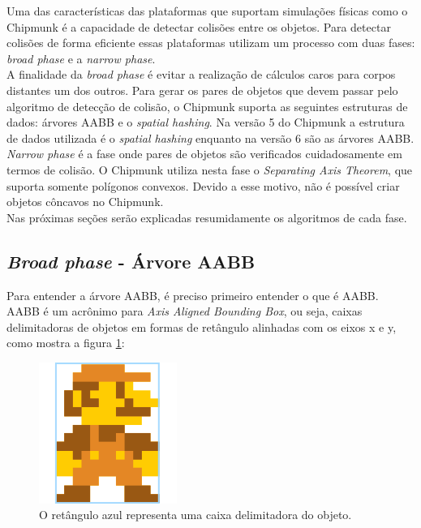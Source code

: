 Uma das características das plataformas que suportam simulações físicas como o Chipmunk é a capacidade de detectar colisões entre os objetos. 
Para detectar colisões de forma eficiente essas plataformas utilizam um processo com duas fases: \textit{broad phase} e a \textit{narrow phase}.\\

A finalidade da \textit{broad phase} é evitar a realização de cálculos caros para corpos distantes um dos outros. Para
gerar os pares de objetos que devem passar pelo algoritmo de detecção de colisão, o Chipmunk suporta as seguintes estruturas de dados:
árvores AABB e o \textit{spatial hashing}. Na versão 5 do Chipmunk a estrutura de dados utilizada é o \textit{spatial hashing} enquanto na versão 6 são as árvores AABB. \\

\textit{Narrow phase} é a fase onde pares de objetos são verificados cuidadosamente em termos de colisão. O Chipmunk utiliza nesta fase o \textit{Separating Axis Theorem}, que suporta somente polígonos convexos. Devido a esse motivo, não é possível criar objetos côncavos no Chipmunk. \\

Nas próximas seções serão explicadas resumidamente os algoritmos de cada fase.

\subsection{\textit{Broad phase} - Árvore AABB}

Para entender a árvore AABB, é preciso primeiro entender o que é AABB. AABB é um acrônimo para \textit{Axis Aligned Bounding Box}, ou seja, caixas delimitadoras de objetos 
em formas de retângulo alinhadas com os eixos x e y, como mostra a figura \ref{mariobb}:

\begin{figure}[!htbp]
  \centering
  \includegraphics[scale=0.3]{mario_bb.png} 
  \caption{O retângulo azul representa uma caixa delimitadora do objeto.}
  \label{mariobb}
\end{figure}

